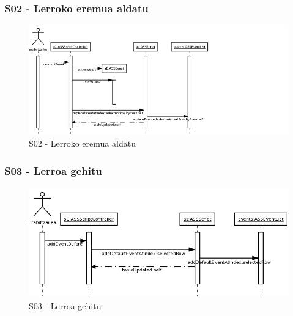 \subsubsection{S02 - Lerroko eremua aldatu}
\begin{figure}[htp]
\begin{center}
\includegraphics[scale=0.5]{Pictures/Chapter4/Diseinua/S02.png}
\caption{S02 - Lerroko eremua aldatu}
\label{s02d}
\end{center}
\end{figure}


\subsubsection{S03 - Lerroa gehitu}
\begin{figure}[htp]
\begin{center}
\includegraphics[scale=0.35]{Pictures/Chapter4/Diseinua/S03.png}
\caption{S03 - Lerroa gehitu}
\label{s03d}
\end{center}
\end{figure}

\newpage
